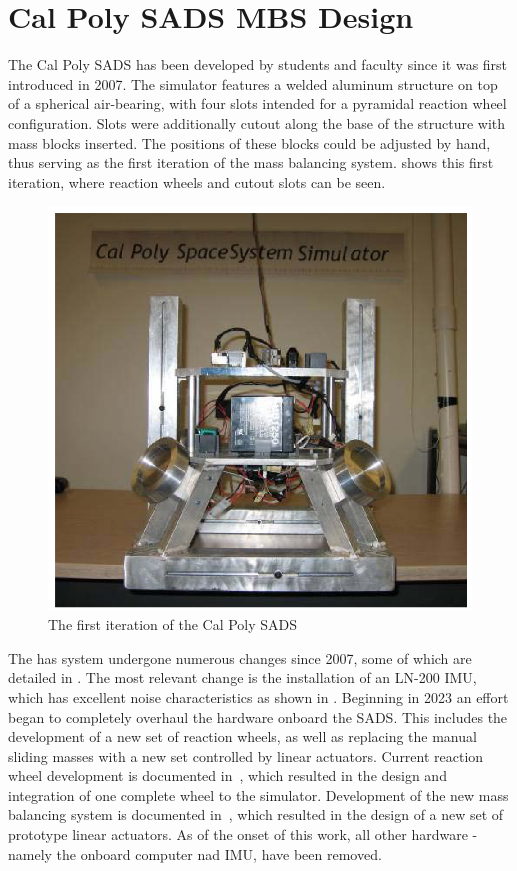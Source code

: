 \section{Cal Poly SADS MBS Design} 

The Cal Poly SADS has been developed by students and faculty since it was first introduced in 2007. The simulator features a welded aluminum structure on top of a spherical air-bearing, with four slots intended for a pyramidal reaction wheel configuration. Slots were additionally cutout along the base of the structure with mass blocks inserted. The positions of these blocks could be adjusted by hand, thus serving as the first iteration of the mass balancing system.  shows this first iteration, where reaction wheels and cutout slots can be seen.
\begin{figure}[h]\label{fig:V1}
    \centering
    \includegraphics[width=0.80\linewidth]{figures/SADS_V1.PNG}
    \caption{The first iteration of the Cal Poly SADS \cite{mittelsteadt_cal_2007}}
    \label{fig:SADS_V1}
\end{figure}

The has system undergone numerous changes since 2007, some of which are detailed in . The most relevant change is the installation of an LN-200 IMU, which has excellent noise characteristics as shown in . Beginning in 2023 an effort began to completely overhaul the hardware onboard the SADS. This includes the development of a new set of reaction wheels, as well as replacing the manual sliding masses with a new set controlled by linear actuators. Current reaction wheel development is documented in~\cite{nalley2025development}, which resulted in the design and integration of one complete wheel to the simulator. Development of the new mass balancing system is documented in~\cite{gilman_automatic_2024}, which resulted in the design of a new set of prototype linear actuators. As of the onset of this work, all other hardware - namely the onboard computer nad IMU, have been removed.